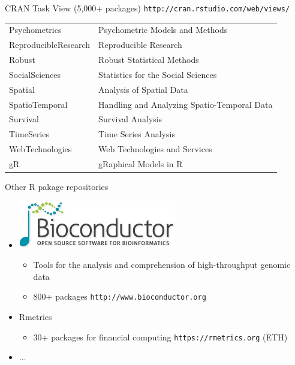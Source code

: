 \begin{frame}
\begin{block}{CRAN Task View (5,000+ packages)
      {\tiny\tt http://cran.rstudio.com/web/views/}}
{\begin{tabular}{ll}
        Psychometrics &	Psychometric Models and Methods \\
        ReproducibleResearch &	Reproducible Research \\
        Robust &	Robust Statistical Methods \\
        SocialSciences &	Statistics for the Social Sciences \\
        Spatial &	Analysis of Spatial Data \\
        SpatioTemporal &	Handling and Analyzing Spatio-Temporal Data \\
        Survival &	Survival Analysis \\
        TimeSeries &	Time Series Analysis \\
        WebTechnologies &	Web Technologies and Services \\
        gR & gRaphical Models in R
      \end{tabular}}
  \end{block}
\end{frame}
\begin{frame}
  \begin{block}{Other R pakage repositories}
    \begin{itemize}
    \item \includegraphics[width=.2\textwidth]{../common/pics/logos/logo_bioconductor.jpg}
      \pause
      \begin{itemize}
      \item Tools for the analysis and comprehension of high-throughput
        genomic data
      \item 800+ packages {\tt http://www.bioconductor.org}
      \end{itemize}
    \item Rmetrics
      \begin{itemize}
      \item 30+ packages for financial computing {\tt https://rmetrics.org} (ETH)
      \end{itemize}
    \item $\ldots$
    \end{itemize}
  \end{block}
\end{frame}


